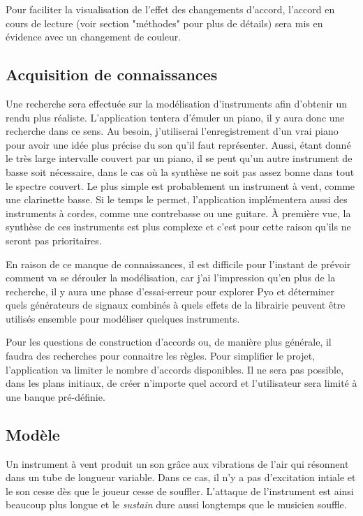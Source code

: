 \documentclass[letterpaper,12pt]{scrartcl}
\begin{document}
	Pour faciliter la visualisation de l'effet des changements d'accord, l'accord en cours de lecture (voir section "méthodes" pour plus de détails) sera mis en évidence avec un changement de couleur. 
	
	
	\subsection{Acquisition de connaissances}
	Une recherche sera effectuée sur la modélisation d'instruments afin d'obtenir un rendu plus réaliste. L'application tentera d'émuler un piano, il y aura donc une recherche dans ce sens. Au besoin, j'utiliserai l'enregistrement d'un vrai piano pour avoir une idée plus précise du son qu'il faut représenter. Aussi, étant donné le très large intervalle couvert par un piano, il se peut qu'un autre instrument de basse soit nécessaire, dans le cas où la synthèse ne soit pas assez bonne dans tout le spectre couvert. Le plus simple est probablement un instrument à vent, comme une clarinette basse. Si le temps le permet, l'application implémentera aussi des instruments à cordes, comme une contrebasse ou une guitare. À première vue, la synthèse de ces instruments est plus complexe et c'est pour cette raison qu'ils ne seront pas prioritaires.
	
	En raison de ce manque de connaissances, il est difficile pour l'instant de prévoir comment va se dérouler la modélisation, car j'ai l'impression qu'en plus de la recherche, il y aura une phase d'essai-erreur pour explorer Pyo et déterminer quels générateurs de signaux combinés à quels effets de la librairie peuvent être utilisés ensemble pour modéliser quelques instruments.
	
	Pour les questions de construction d'accords ou, de manière plus générale, il faudra des recherches pour connaitre les règles. Pour simplifier le projet, l'application va limiter le nombre d'accords disponibles. Il ne sera pas possible, dans les plans initiaux, de créer n'importe quel accord et l'utilisateur sera limité à une banque pré-définie.
	
	\subsection{Modèle}
	
	Un instrument à vent produit un son grâce aux vibrations de l'air qui résonnent dans un tube de longueur variable. Dans ce cas, il n'y a pas d'excitation intiale et le son cesse dès que le joueur cesse de souffler. L'attaque de l'instrument est ainsi beaucoup plus longue et le \textit{sustain} dure aussi longtemps que le musicien souffle. 
	
\end{document}
